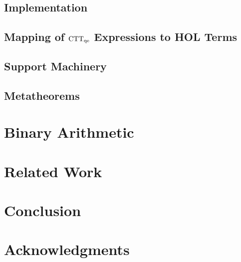 \documentclass[fleqn]{article}
\begin{document}
\subsection{Implementation}

\subsection{Mapping of ${\rm CTT_{qe}}$ Expressions to HOL Terms}

\subsection{Support Machinery}

\subsection{Metatheorems}

\section{Binary Arithmetic} \label{sec:binary-arithmetic}

\section{Related Work} \label{sec:related-work}

\section{Conclusion} \label{sec:conclusion}

\section*{Acknowledgments} 



\end{document}
